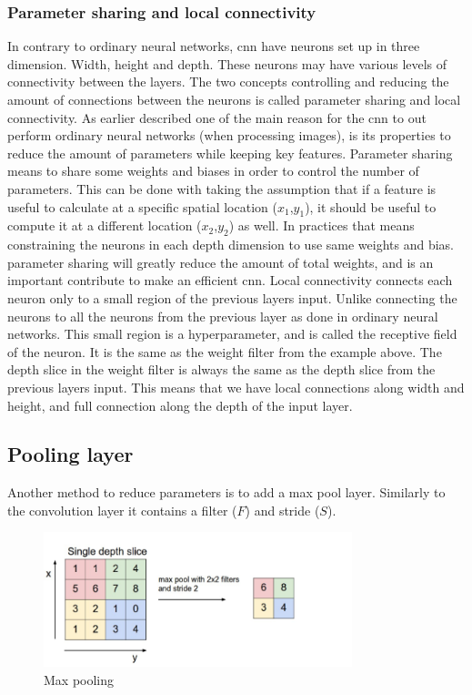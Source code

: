 \documentclass[USenglish]{ifimaster}  %
\begin{document}
\subsubsection{Parameter sharing and local connectivity}
In contrary to ordinary neural networks, \ac{cnn} have neurons set up in three dimension. Width, height and depth. These neurons may have various levels of connectivity between the layers. The two concepts controlling and reducing the amount of connections between the neurons is called parameter sharing and local connectivity. As earlier described one of the main reason for the \ac{cnn} to out perform ordinary neural networks (when processing images), is its properties to reduce the amount of parameters while keeping key features. 
\newline
\newline
Parameter sharing means to share some weights and biases in order to control the number of parameters. This can be done with taking the assumption that if a feature is useful to calculate at a specific spatial location ($x_1$,$y_1$), it should be useful to compute it at a different location ($x_2$,$y_2$) as well. In practices that means constraining the neurons in each depth dimension to use same weights and bias. parameter sharing will greatly reduce the amount of total weights, and is an important contribute to make an efficient \ac{cnn}. 
\newline
\newline
Local connectivity connects each neuron only to a small region of the previous layers input. Unlike connecting the neurons to all the neurons from the previous layer as done in ordinary neural networks.
This small region is a hyperparameter, and is called the receptive field of the neuron. It is the same as the weight filter from the example above. The depth slice in the weight filter is always the same as the depth slice from the previous layers input. This means that we have local connections along width and height, and full connection along the depth of the input layer.

\subsection{Pooling layer}
Another method to reduce parameters is to add a max pool layer. Similarly to the convolution layer it contains a filter ($F$) and stride ($S$). 

\begin{figure}[ht]
    \centering
    \includegraphics[width=0.8\textwidth]{bilder/max_pooling.png}
    \caption{Max pooling \cite{website:cs231n}}
    \label{fig:max_pooling}
\end{figure}
\end{document}
